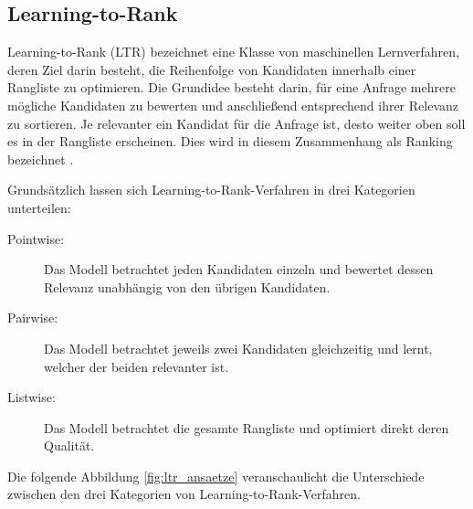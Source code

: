\subsection{Learning-to-Rank}
\label{sec:learning_to_rank}

Learning-to-Rank (LTR) bezeichnet eine Klasse von maschinellen Lernverfahren, deren Ziel darin besteht, die Reihenfolge von Kandidaten innerhalb einer Rangliste zu optimieren. 
Die Grundidee besteht darin, für eine Anfrage mehrere mögliche Kandidaten zu bewerten und anschließend entsprechend ihrer Relevanz zu sortieren. 
Je relevanter ein Kandidat für die Anfrage ist, desto weiter oben soll es in der Rangliste erscheinen. Dies wird in diesem Zusammenhang als Ranking bezeichnet \parencite{liu2009learning}.

Grundsätzlich lassen sich Learning-to-Rank-Verfahren in drei Kategorien unterteilen:

\begin{description} 
  \item[Pointwise:] Das Modell betrachtet jeden Kandidaten einzeln und bewertet dessen Relevanz unabhängig von den übrigen Kandidaten. 
  \item[Pairwise:] Das Modell betrachtet jeweils zwei Kandidaten gleichzeitig und lernt, welcher der beiden relevanter ist. 
  \item[Listwise:] Das Modell betrachtet die gesamte Rangliste und optimiert direkt deren Qualität. 
\end{description} 

Die folgende Abbildung \ref{fig:ltr_ansaetze} veranschaulicht die Unterschiede zwischen den drei Kategorien von Learning-to-Rank-Verfahren.

